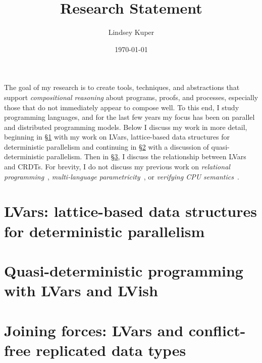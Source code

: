 \documentclass{article}
\begin{document}
\title{Research Statement}

\author{Lindsey Kuper}

\date{\today}

\maketitle


The goal of my research is to create tools, techniques, and
abstractions that support \emph{compositional reasoning} about
programs, proofs, and processes, especially those that do not
immediately appear to compose well.  To this end, I study programming
languages, and for the last few years my focus has been on parallel
and distributed programming models.  Below I discuss my work in more
detail, beginning in \S\ref{lvars} with my work on LVars,
lattice-based data structures for deterministic parallelism and
continuing in \S\ref{quasi} with a discussion of quasi-deterministic
parallelism.  Then in \S\ref{crdts}, I discuss the relationship
between LVars and CRDTs.  For brevity, I do not discuss my previous
work on \emph{relational programming}~\cite{lambdae},
\emph{multi-language parametricity}~\cite{multilang-talk}, or
\emph{verifying CPU semantics}~\cite{tsl-tr}.

\section{LVars: lattice-based data structures for deterministic parallelism}\label{lvars}


\section{Quasi-deterministic programming with LVars and LVish}\label{quasi}


\section{Joining forces: LVars and conflict-free replicated data types}\label{crdts}

\newpage



\end{document}

